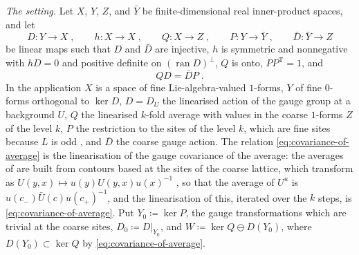 \documentclass[11pt]{preprint}
\numberwithin{equation}{section}
\theoremstyle{definition}
\theoremstyle{remark}
\theoremstyle{plain}
\begin{document}
\emph{The setting.} Let $X$, $Y$, $Z$, and $\bar Y$ be finite-dimensional real inner-product spaces, and let
\begin{equation}\label{eq:linear-setting}
    D \colon Y \to X\;,
    \qquad
    h \colon X \to X\;,
    \qquad
    Q \colon X \to Z\;,
    \qquad
    P \colon Y \to \bar Y\;,
    \qquad
    \bar D \colon \bar Y \to Z
\end{equation}
be linear maps such that $D$ and $\bar D$ are injective, $h$ is symmetric and nonnegative with $hD = 0$ and positive definite on $(\operatorname{ran}D)^\perp$, $Q$ is onto, $PP^{\mathrm T} = 1$, and
\begin{equation}\label{eq:covariance-of-average}
    QD = \bar DP\;.
\end{equation}
In the application $X$ is a space of fine Lie-algebra-valued $1$-forms, $Y$ of fine $0$-forms orthogonal to $\ker D$, $D = D_U$ the linearised action of the gauge group at a background $U$, $Q$ the linearised $k$-fold average with values in the coarse $1$-forms $Z$ of the level $k$, $P$ the restriction to the sites of the level $k$, which are fine sites because $L$ is odd \cite[p.~251]{BalabanRG1}, and $\bar D$ the coarse gauge action. The relation \eqref{eq:covariance-of-average} is the linearisation of the gauge covariance of the average: the averages of \cite[(0.4), (0.12), pp.~253--254]{BalabanRG1} are built from contours based at the sites of the coarse lattice, which transform as $U(y, x) \mapsto u(y)U(y, x)u(x)^{-1}$ \cite[(0.6)]{BalabanRG1}, so that the average of $U^u$ is $u(c_-)\bar U(c)u(c_+)^{-1}$, and the linearisation of this, iterated over the $k$ steps, is \eqref{eq:covariance-of-average}. Put $Y_0 \coloneqq \ker P$, the gauge transformations which are trivial at the coarse sites, $D_0 \coloneqq D|_{Y_0}$, and $W \coloneqq \ker Q \ominus D(Y_0)$, where $D(Y_0) \subset \ker Q$ by \eqref{eq:covariance-of-average}.
\end{document}
